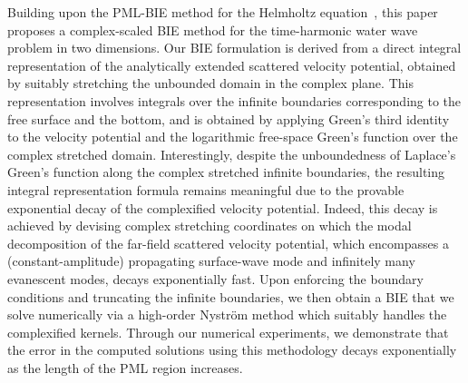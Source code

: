 \documentclass[review,hidelinks,onefignum,onetabnum]{siamart220329}
\begin{document}

Building upon the PML-BIE method for the Helmholtz equation~\cite{lu2018perfectly}, this paper proposes a complex-scaled BIE method for the time-harmonic water wave problem in two dimensions. Our BIE formulation is derived from a direct integral representation of the analytically extended scattered velocity potential, obtained by suitably stretching the unbounded domain in the complex plane. This representation involves integrals over the infinite boundaries corresponding to the free surface and the bottom, and is obtained by applying  Green's third identity to the velocity potential and the logarithmic free-space Green's function over the complex stretched domain. Interestingly, despite the unboundedness of Laplace's Green's function along the complex stretched infinite boundaries, the resulting integral representation formula remains meaningful due to the provable exponential decay of the complexified velocity potential. Indeed, this decay is achieved by devising complex stretching coordinates on which the modal decomposition of the far-field scattered velocity potential, which encompasses a (constant-amplitude) propagating surface-wave mode and infinitely many evanescent modes, decays exponentially fast. Upon enforcing the boundary conditions and truncating the infinite boundaries, we then obtain a BIE that we solve numerically via a high-order Nystr\"om method which suitably handles the complexified kernels. Through our numerical experiments, we demonstrate that the error in the computed solutions using this methodology decays exponentially as the length of the PML region increases. 
\end{document}
